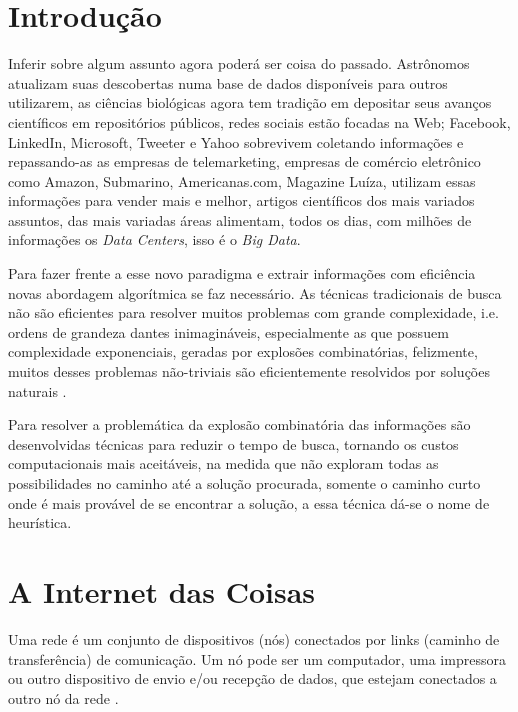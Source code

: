 \documentclass[conference,compsoc]{IEEEtran}
\begin{document}
\vspace{0.1cm}





\section{Introdução}

Inferir sobre algum assunto agora poderá ser coisa do passado. Astrônomos atualizam suas descobertas numa base de 
dados disponíveis para outros utilizarem, as ciências biológicas agora tem tradição em depositar seus avanços 
científicos em repositórios públicos, redes sociais estão focadas na Web; Facebook, 
LinkedIn, Microsoft, Tweeter e Yahoo sobrevivem coletando informações e repassando-as as empresas de telemarketing, 
empresas de comércio eletrônico como Amazon, Submarino, Americanas.com, Magazine Luíza, utilizam essas informações 
para vender mais e melhor, artigos científicos dos mais variados assuntos, das mais variadas áreas alimentam, 
todos os dias,  com milhões de informações os \textit{Data Centers}, isso é o \textit{Big Data}.


Para fazer frente a esse novo paradigma e extrair informações com eficiência novas abordagem algorítmica se faz necessário. 
As técnicas tradicionais de busca não são eficientes para resolver muitos problemas com grande complexidade, i.e. ordens de grandeza 
dantes inimagináveis, especialmente as que possuem complexidade exponenciais, geradas por explosões combinatórias, felizmente, 
muitos desses problemas não-triviais são eficientemente resolvidos por soluções naturais \cite{Swarm_Medeiros}.

Para resolver a problemática da explosão combinatória das informações são desenvolvidas técnicas para reduzir o tempo de busca, 
tornando os custos computacionais mais aceitáveis, na medida que não exploram todas as possibilidades no caminho até a 
solução procurada, somente o caminho curto onde é mais provável de se encontrar a solução, a essa técnica dá-se o nome de heurística.




\section{A Internet das Coisas}
Uma rede é um conjunto de dispositivos (nós) conectados por links (caminho de transferência) de comunicação.  Um nó pode ser um computador, uma impressora ou outro dispositivo de envio e/ou recepção de dados, que estejam conectados a outro nó da rede \cite{Forouzan}.
\end{document}
